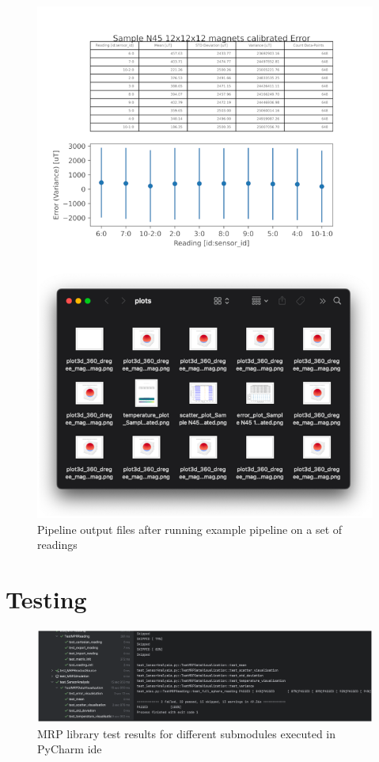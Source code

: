 \begin{figure}
\centering
\includegraphics{./generated_images/border_Pipeline_output_files_after_running_example_pipeline_on_a_set_of_readings.png}
\caption{Pipeline output files after running example pipeline on a set
of readings
\label{Pipeline_output_files_after_running_example_pipeline_on_a_set_of_readings.png}}
\end{figure}

\hypertarget{testing}{%
\section{Testing}\label{testing}}

\begin{figure}
\centering
\includegraphics{./generated_images/border_MRP_library_test_results_for_different_submodules_executed_in_PyCharm_(+ide).png}
\caption{MRP library test results for different submodules executed in
PyCharm \gls{ide}
\label{MRP_library_test_results_for_different_submodules_executed_in_PyCharm_(+ide).png}}
\end{figure}

